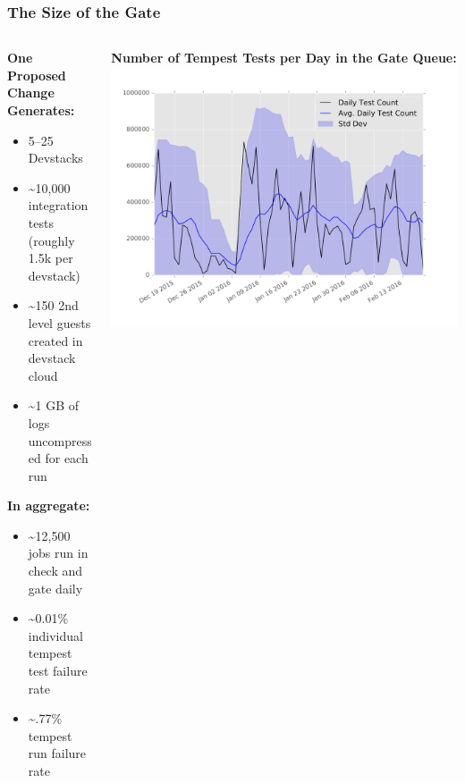 \documentclass[aspectratio=169,11pt,hyperref={colorlinks=true}]{beamer}
\begin{document}
\begin{frame}
\frametitle{The Size of the Gate}
    \begin{columns}[T]
        \begin{column}{.48\textwidth}
            \textbf{One Proposed Change Generates:}
			\begin{itemize}
				\item 5--25 Devstacks
				\item \textasciitilde10,000 integration tests (roughly 1.5k per devstack)
                \item \textasciitilde150 2nd level guests created in devstack cloud
                \item \textasciitilde1 GB of logs uncompressed for each run
			\end{itemize}
            \textbf{In aggregate:}
            \begin{itemize}
                \item \textasciitilde12,500 jobs run in check and gate daily
                \item \textasciitilde0.01\% individual tempest test failure rate
                \item \textasciitilde.77\% tempest run failure rate
            \end{itemize}
        \end{column}
        \begin{column}{.48\textwidth}
            \centering
            \textbf{Number of Tempest Tests per Day in the Gate Queue:}
            \includegraphics[width=1.22\textwidth]{tempest-gate-count.png}
        \end{column}
    \end{columns}
\end{frame}
\end{document}

